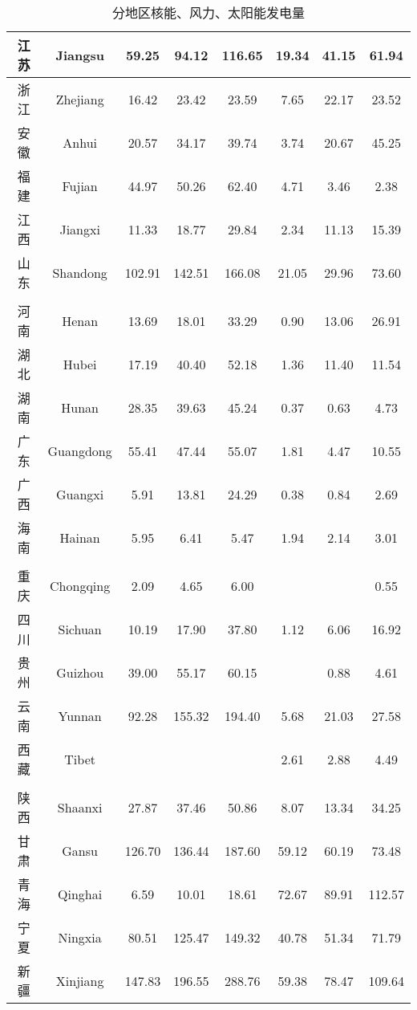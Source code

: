 \begin{table}[]
\begin{tabular}{|c|c|c|c|c|c|c|c|}
    江  苏 & Jiangsu & 59.25 & 94.12 & 116.65 & 19.34 & 41.15 & 61.94 \\ \hline
    浙  江 & Zhejiang & 16.42 & 23.42 & 23.59 & 7.65 & 22.17 & 23.52 \\ \hline
    安  徽 & Anhui & 20.57 & 34.17 & 39.74 & 3.74 & 20.67 & 45.25 \\ \hline
    福  建 & Fujian & 44.97 & 50.26 & 62.40 & 4.71 & 3.46 & 2.38 \\ \hline
    江  西 & Jiangxi & 11.33 & 18.77 & 29.84 & 2.34 & 11.13 & 15.39 \\ \hline
    山  东 & Shandong & 102.91 & 142.51 & 166.08 & 21.05 & 29.96 & 73.60 \\ \hline
     &  &  &  &  &  &  &  \\ \hline
    河  南 & Henan & 13.69 & 18.01 & 33.29 & 0.90 & 13.06 & 26.91 \\ \hline
    湖  北 & Hubei & 17.19 & 40.40 & 52.18 & 1.36 & 11.40 & 11.54 \\ \hline
    湖  南 & Hunan & 28.35 & 39.63 & 45.24 & 0.37 & 0.63 & 4.73 \\ \hline
    广  东 & Guangdong & 55.41 & 47.44 & 55.07 & 1.81 & 4.47 & 10.55 \\ \hline
    广  西 & Guangxi & 5.91 & 13.81 & 24.29 & 0.38 & 0.84 & 2.69 \\ \hline
    海  南 & Hainan & 5.95 & 6.41 & 5.47 & 1.94 & 2.14 & 3.01 \\ \hline
     &  &  &  &  &  &  &  \\ \hline
    重  庆 & Chongqing & 2.09 & 4.65 & 6.00 &  &  & 0.55 \\ \hline
    四  川 & Sichuan & 10.19 & 17.90 & 37.80 & 1.12 & 6.06 & 16.92 \\ \hline
    贵  州 & Guizhou & 39.00 & 55.17 & 60.15 &  & 0.88 & 4.61 \\ \hline
    云  南 & Yunnan & 92.28 & 155.32 & 194.40 & 5.68 & 21.03 & 27.58 \\ \hline
    西  藏 & Tibet &  &  &  & 2.61 & 2.88 & 4.49 \\ \hline
     &  &  &  &  &  &  &  \\ \hline
    陕  西 & Shaanxi & 27.87 & 37.46 & 50.86 & 8.07 & 13.34 & 34.25 \\ \hline
    甘  肃 & Gansu & 126.70 & 136.44 & 187.60 & 59.12 & 60.19 & 73.48 \\ \hline
    青  海 & Qinghai & 6.59 & 10.01 & 18.61 & 72.67 & 89.91 & 112.57 \\ \hline
    宁  夏 & Ningxia & 80.51 & 125.47 & 149.32 & 40.78 & 51.34 & 71.79 \\ \hline
    新  疆 & Xinjiang & 147.83 & 196.55 & 288.76 & 59.38 & 78.47 & 109.64 \\ \hline
    \end{tabular}
    \caption{分地区核能、风力、太阳能发电量}
    \label{tab:PowerGenerated}
\end{table}

